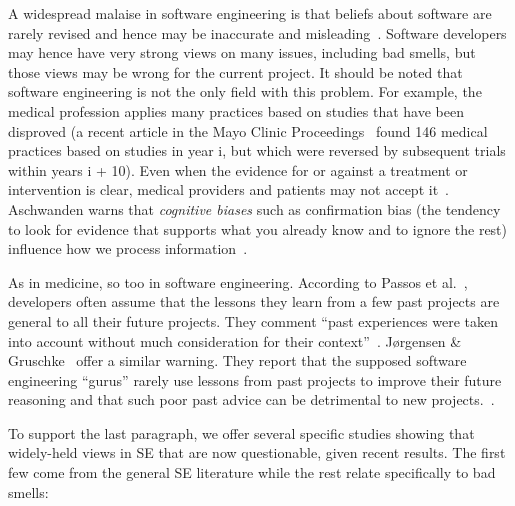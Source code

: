 \documentclass{sig-alternate}
\begin{document}
A widespread malaise in software engineering is that
beliefs about software are rarely revised and hence may be
  inaccurate and 
misleading~\cite{passos11,jorgensen09,mei15,me16phase,prem16}. Software developers may hence have very
strong views on many issues, including bad smells, but those views may be wrong for the current
project.
It should be noted that  software engineering is not the only field with this problem.
  For example, the medical profession applies many practices based on studies that have been disproved (a recent article in the Mayo Clinic Proceedings~\cite{prasad13} found 146 medical practices based on studies in year i, but which were reversed by subsequent trials within years i + 10). Even when the evidence for or against a treatment or intervention is clear, medical providers and patients may not accept it~\cite{aschwanden10}. Aschwanden warns that {\em cognitive biases} such as confirmation bias (the tendency to look for evidence that supports what you already know and to ignore the rest) influence how we process information~\cite{aschwanden15}.

As in medicine, so too in software engineering.
According to Passos et al.~\cite{passos11},  developers often  assume that the lessons they learn from a few past projects are general to all their future projects. They comment ``past experiences were taken into account without much consideration for their context''~\cite{passos11}.  J{\o}rgensen \& Gruschke~\cite{jorgensen09} offer a similar warning. They report that the supposed software engineering ``gurus'' rarely use lessons from past projects to improve their future reasoning and that such poor past advice can be detrimental to new projects.~\cite{jorgensen09}. 

To support the last paragraph, we offer several
specific studies
showing that   widely-held views in SE that are   now questionable, given recent results. 
The first few come from the general SE literature while the rest
relate specifically to bad smells:
\end{document}
